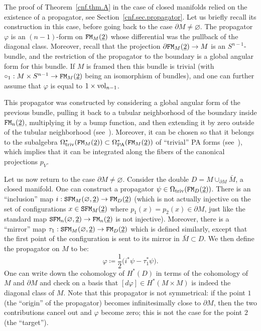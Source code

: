 The proof of Theorem~\ref{cnf.thm.A} in the case of closed manifolds relied on the existence of a propagator, see Section~\ref{cnf.sec.propagator}.
Let us briefly recall its construction in this case, before going back to the case $\partial M \neq \varnothing$.
The propagator $\varphi$ is an $(n-1)$-form on $\mathtt{FM}_{M}(\underline{2})$ whose differential was the pullback of the diagonal class.
Moreover, recall that the projection $\partial \mathtt{FM}_{M}(\underline{2}) \to M$ is an $S^{n-1}$-bundle, and the restriction of the propagator to the boundary is a global angular form for this bundle.
If $M$ is framed then this bundle is trivial (with $\circ_{1} : M \times S^{n-1} \to \mathtt{FM}_{M}(\underline{2})$ being an isomorphism of bundles), and one can further assume that $\varphi$ is equal to $1 \times \mathrm{vol}_{n-1}$.

This propagator was constructed by considering a global angular form of the previous bundle, pulling it back to a tubular neighborhood of the boundary inside $\mathtt{FM}_{n}(\underline{2})$, multiplying it by a bump function, and then extending it by zero outside of the tubular neighborhood (see~\cite[Proposition~7]{CamposWillwacher2016}).
Moreover, it can be chosen so that it belongs to the subalgebra $\Omega^{*}_{\mathrm{triv}}(\mathtt{FM}_{M}(\underline{2})) \subset \Omega_{\mathrm{PA}}^{*}(\mathtt{FM}_{M}(\underline{2}))$ of ``trivial'' PA forms (see~\cite[Appendix~C]{CamposWillwacher2016}), which implies that it can be integrated along the fibers of the canonical projections $p_{V}$.

Let us now return to the case $\partial M \neq \varnothing$.
Consider the double $D = M \cup_{\partial M} \bar{M}$, a closed manifold.
One can construct a propagator $\psi \in \Omega_{\mathrm{triv}}(\mathtt{FM}_{D}(\underline{2}))$.
There is an ``inclusion'' map $i : \mathtt{SFM}_{M}(\varnothing, \underline{2}) \to \mathtt{FM}_{D}(\underline{2})$ (which is not actually injective on the set of configurations $x \in \mathtt{SFM}_{M}(\underline{2})$ where $p_{1}(x) = p_{2}(x) \in \partial M$, just like the standard map $\mathtt{SFM}_{n}(\varnothing, \underline{2}) \to \mathtt{FM}_{n}(\underline{2})$ is not injective).
Moreover, there is a ``mirror'' map $\tau_{1} : \mathtt{SFM}_{M}(\varnothing, \underline{2}) \to \mathtt{FM}_{D}(\underline{2})$ which is defined similarly, except that the first point of the configuration is sent to its mirror in $\bar{M} \subset D$.
We then define the propagator on $M$ to be:
\begin{equation}
  \label{cnfbnd.eq.propagator}
  \varphi \coloneqq \frac{1}{2} \bigl( i^{*}\psi - \tau_{1}^{*}\psi \bigr).
\end{equation}
One can write down the cohomology of $H^{*}(D)$ in terms of the cohomology of $M$ and $\partial M$ and check on a basis that $[d \varphi] \in H^{*}(M \times M)$ is indeed the diagonal class of $M$.
Note that this propagator is not symmetrical: if the point $1$ (the ``origin'' of the propagator) becomes infinitesimally close to $\partial M$, then the two contributions cancel out and $\varphi$ become zero; this is not the case for the point $2$ (the ``target'').

